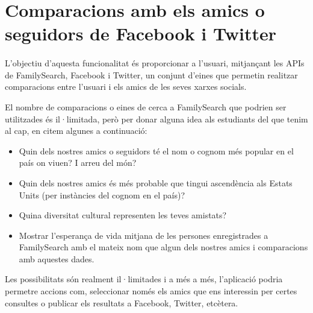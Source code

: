 \section{Comparacions amb els amics o seguidors de Face\-book i Twitter}

    \paragraph{}
    L'objectiu d'aquesta funcionalitat és proporcionar a l'usuari, mitjançant les APIs de FamilySearch, Facebook i Twitter, un conjunt d'eines que permetin realitzar comparacions entre l'usuari i els amics de les seves xarxes socials.

    El nombre de comparacions o eines de cerca a FamilySearch que podrien ser utilitzades és il·limitada, però per donar alguna idea als estudiants del que tenim al cap, en citem algunes a continuació:

    \begin{itemize}
        \item Quin dels nostres amics o seguidors té el nom o cognom més popular en el país on viuen? I arreu del món?
        \item Quin dels nostres amics és més probable que tingui ascendència als Estats Units (per instàncies del cognom en el país)?
        \item Quina diversitat cultural representen les teves amistats?
        \item Mostrar l'esperança de vida mitjana de les persones enregistrades a FamilySearch amb el mateix nom que algun dels nostres amics i comparacions amb aquestes dades.
    \end{itemize}

    Les possibilitats són realment il·limitades i a més a més, l'aplicació podria permetre accions com, seleccionar només els amics que ens interessin per certes consultes o publicar els resultats a Facebook, Twitter, etcètera.
